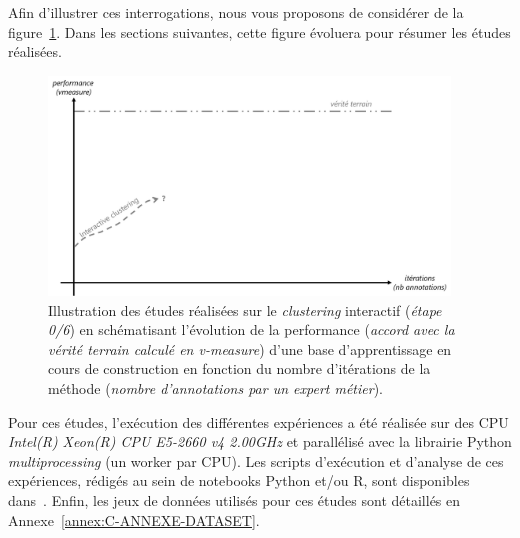 	Afin d'illustrer ces interrogations, nous vous proposons de considérer de la figure~\ref{figure:HYPOTHESE-00-DEFAULT}. Dans les sections suivantes, cette figure évoluera pour résumer les études réalisées.
	\begin{figure}[!htb]
		\centering
		\includegraphics[width=0.95\textwidth]{figures/hypotheses-00-default}
		\caption{Illustration des études réalisées sur le \textit{clustering} interactif (\textit{étape 0/6}) en schématisant l'évolution de la performance (\textit{accord avec la vérité terrain calculé en v-measure}) d'une base d'apprentissage en cours de construction en fonction du nombre d'itérations de la méthode (\textit{nombre d'annotations par un expert métier}).}
		\label{figure:HYPOTHESE-00-DEFAULT}
	\end{figure}
	
	\begin{leftBarInformation}
		Pour ces études, l'exécution des différentes expériences a été réalisée sur des CPU \textit{Intel(R) Xeon(R) CPU E5-2660 v4 \@ 2.00GHz} et parallélisé avec la librairie Python \textit{multiprocessing} (un worker par CPU).
		Les scripts d'exécution et d'analyse de ces expériences, rédigés au sein de notebooks Python et/ou R, sont disponibles dans~\cite{schild:cognitivefactory-interactive-clustering-comparative-study:2021}.
		Enfin, les jeux de données utilisés pour ces études sont détaillés en Annexe~\ref{annex:C-ANNEXE-DATASET}.
	\end{leftBarInformation}
	
    \minitoc

	\newpage
	


